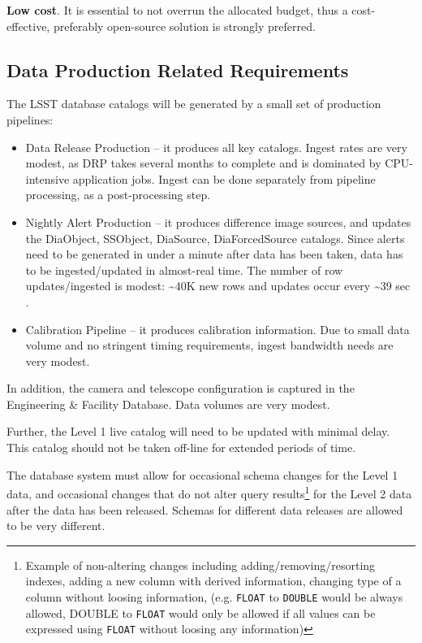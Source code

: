 \documentclass[DM,toc]{lsstdoc}
\begin{document}
\textbf{Low cost}. It is essential to not overrun the allocated budget,
thus a cost-effective, preferably open-source solution is strongly
preferred.

\subsection{Data Production Related Requirements}\label{data-production-related-requirements}

The LSST database catalogs will be generated by a small set of production
pipelines:

\begin{itemize}
\item
  Data Release Production -- it produces all key catalogs. Ingest rates
  are very modest, as DRP takes several months to complete and is
  dominated by CPU-intensive application jobs. Ingest can be done
  separately from pipeline processing, as a post-processing step.
\item
  Nightly Alert Production -- it produces difference image sources, and
  updates the DiaObject, SSObject, DiaSource, DiaForcedSource catalogs.
  Since alerts need to be generated in under a minute after data has
  been taken, data has to be ingested/updated in almost-real time. The
  number of row updates/ingested is modest: \textasciitilde{}40K new
  rows and updates occur every \textasciitilde{}39 sec \citep{2008ASPC..394..114B}.
\item
  Calibration Pipeline -- it produces calibration information. Due to
  small data volume and no stringent timing requirements, ingest
  bandwidth needs are very modest.
\end{itemize}

In addition, the camera and telescope configuration is captured in the
Engineering \& Facility Database. Data volumes are very modest.

Further, the Level 1 live catalog will need to be updated with minimal
delay. This catalog should not be taken off-line for extended periods of
time.

The database system must allow for occasional schema changes for the
Level 1 data, and occasional changes that do not alter query
results\footnote{Example of non-altering changes including
  adding/removing/resorting indexes, adding a new column with derived
  information, changing type of a column without loosing information,
  (e.g. \texttt{FLOAT} to \texttt{DOUBLE} would be always allowed,
  DOUBLE to \texttt{FLOAT} would only be allowed if all values can be
  expressed using \texttt{FLOAT} without loosing any information)} for
the Level 2 data after the data has been released. Schemas for different
data releases are allowed to be very different.
\end{document}
